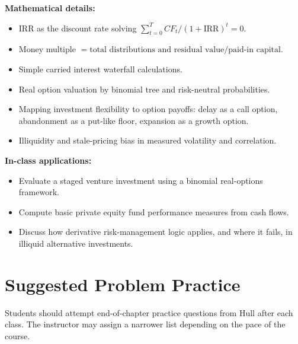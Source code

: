 \documentclass[11pt]{article}
\begin{document}
\textbf{Mathematical details:}
\begin{itemize}
    \item IRR as the discount rate solving $\sum_{t=0}^{T}CF_t/(1+\mathrm{IRR})^t=0$.
    \item Money multiple $=\text{total distributions and residual value}/\text{paid-in capital}$.
    \item Simple carried interest waterfall calculations.
    \item Real option valuation by binomial tree and risk-neutral probabilities.
    \item Mapping investment flexibility to option payoffs: delay as a call option, abandonment as a put-like floor, expansion as a growth option.
    \item Illiquidity and stale-pricing bias in measured volatility and correlation.
\end{itemize}

\textbf{In-class applications:}
\begin{itemize}
    \item Evaluate a staged venture investment using a binomial real-options framework.
    \item Compute basic private equity fund performance measures from cash flows.
    \item Discuss how derivative risk-management logic applies, and where it fails, in illiquid alternative investments.
\end{itemize}

\section*{Suggested Problem Practice}

Students should attempt end-of-chapter practice questions from Hull after each class. The instructor may assign a narrower list depending on the pace of the course.
\end{document}
